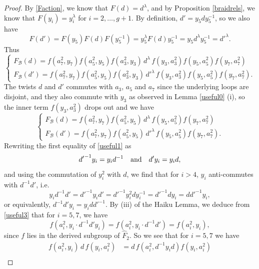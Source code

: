 \documentclass[a4paper,10pt,reqno]{amsart}
\begin{document}
\begin{proof}

By \eqref{Faction}, we know that $F(d)=d^\lambda$, and by 
Proposition \ref{braidrels}, we know that $F(y_i)=y_i^\lambda$ for $i=2,\ldots,g+1$.
By definition, $d'=y_5dy_5^{-1}$, so we also have
$$F(d')=F(y_5)F(d)F(y_5^{-1})=y_5^\lambda F(d) y_5^{-1}=y_5 d^\lambda y_5^{-1}={d'}^\lambda.$$
Thus
\begin{equation*}
\begin{cases}
F_{\mathcal{B}}(d)=f(a_7^2,y_7)f(a_5^2,y_5)f(a_3^2,y_3)\,d^\lambda\, f(y_3,a_3^2)f(y_5,a_5^2) f(y_7,a_7^2)\\
F_{\mathcal{B}}(d')=f(a_7^2,y_7)f(a_5^2,y_5)f(a_3^2,y_3)\,{d'}^\lambda\, f(y_3,a_3^2)f(y_5,a_5^2) f(y_7,a_7^2).
\end{cases}
\end{equation*}
The twists $d$ and $d'$ commutes with $a_3$, $a_5$ and $a_7$ since the underlying loops are disjoint, and they also commute with $y_3$ as observed in
Lemma \ref{useful0} (i), so
the inner term $f(y_3,a_3^2)$ drops out and we have
\begin{equation*}
\begin{cases}
F_{\mathcal{B}}(d)=f(a_7^2,y_7)f(a_5^2,y_5)\,d^\lambda\, f(y_5,a_5^2) f(y_7,a_7^2)\\
F_{\mathcal{B}}(d')=f(a_7^2,y_7)f(a_5^2,y_5)\,{d'}^\lambda\, f(y_5,a_5^2) f(y_7,a_7^2).
\end{cases}
\end{equation*}
Rewriting the first equality of \eqref{useful1} as
\begin{equation}\label{useful2}
{d'}^{-1}y_i=y_id^{-1} \ \ \ {\rm and}\ \ \ d'y_i=y_id,
\end{equation} 
and using the commutation of $y_i^2$ with $d$, we find that for $i>4$, $y_i$ anti-commutes with
$d^{-1}d'$, i.e.
\begin{equation}\label{useful3}
y_id^{-1}d'={d'}^{-1}y_id'={d'}^{-1}y_i^2dy_i^{-1}={d'}^{-1}dy_i=d{d'}^{-1}y_i,
\end{equation}
or equivalently, $d^{-1}d'y_i=y_id{d'}^{-1}$.
By (iii) of the Haiku Lemma, we deduce from \eqref{useful3} that for $i=5,7$, we have
\begin{equation}\label{useful4}
f(a_i^2,y_i\cdot d^{-1}d'y_i)=f(a_i^2,y_i\cdot d^{-1}d')=f(a_i^2,y_i),
\end{equation}
since $f$ lies in the derived subgroup of $\widehat{F}_2$.  So we see that for $i=5,7$ we have
\begin{align*}
f(a_i^2,y_i)\,d\,f(y_i,a_i^2)&=d\,f(a_i^2,d^{-1}y_id)f(y_i,a_i^2)\\

\end{align*}
\end{proof}
\end{document}
